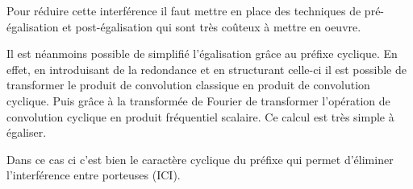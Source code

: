 Pour réduire cette interférence il faut mettre en place des techniques de
pré-égalisation et post-égalisation qui sont très coûteux à mettre en oeuvre.




Il est néanmoins possible de simplifié l'égalisation grâce au préfixe cyclique.
En effet, en introduisant de la redondance et en structurant celle-ci il est
possible de transformer le produit de convolution classique en produit de
convolution cyclique. Puis grâce à la transformée de Fourier de transformer
l'opération de convolution cyclique en produit fréquentiel scalaire. Ce calcul
est très simple à égaliser.

Dans ce cas ci c'est bien le caractère cyclique du préfixe qui permet d'éliminer
l'interférence entre porteuses (ICI).


